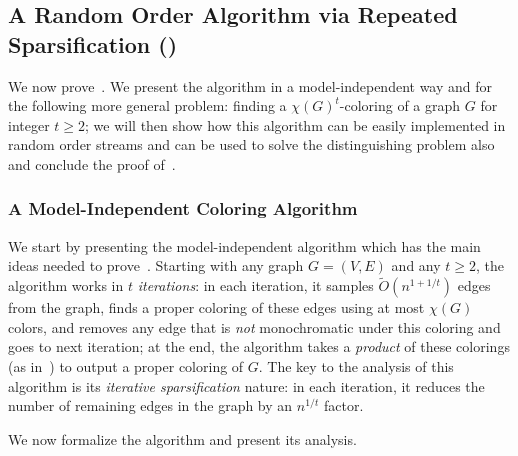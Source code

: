 \documentclass[11pt]{article}
\theoremstyle{definition}
\renewcommand{\geq}{\geqslant}
\newcommand{\Ot}{\ensuremath{\widetilde{O}}}
\begin{document}
	
\subsection{A Random Order Algorithm via Repeated Sparsification ()}\label{sec:random-alg}

We now prove~. We present the algorithm in a model-independent way and for the following more general problem: finding a $\chi(G)^t$-coloring of a graph $G$ for integer $t \geq 2$; we will then show how this algorithm can be easily implemented in random order streams and can be used to solve the distinguishing problem also and conclude the proof of~. 

\subsubsection{A Model-Independent Coloring Algorithm}
We start by presenting the model-independent algorithm which has the main ideas needed to prove~. Starting with any graph $G=(V,E)$ and any $t \geq 2$, the algorithm works in $t$ \emph{iterations}: in each iteration, 
it samples $\Ot(n^{1+1/t})$ edges from the graph, finds a proper coloring of these edges using at most $\chi(G)$ colors, and removes any edge that is \emph{not} monochromatic under this coloring and goes to next iteration; at the end, 
the algorithm takes a \emph{product} of these colorings (as in~) to output a proper coloring of $G$. The key to the analysis of this algorithm is its \emph{iterative sparsification} nature: in each iteration, 
it reduces the number of remaining edges in the graph by an $n^{1/t}$ factor. 

We now formalize the algorithm and present its analysis. 

\newcommand{\Mi}[1]{\ensuremath{M_{#1}}}
\newcommand{\Hi}[1]{\ensuremath{H_{#1}}}
\newcommand{\Ci}[1]{\ensuremath{C_{#1}}}
\end{document}
